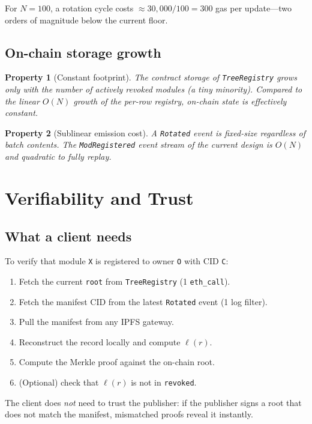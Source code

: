 \documentclass[11pt,a4paper]{article}
\newtheorem{property}{Property}[section]
\begin{document}
For $N = 100$, a rotation cycle costs $\approx 30{,}000 / 100 = 300$ gas per update---two orders of magnitude below the current floor.

\subsection{On-chain storage growth}

\begin{property}[Constant footprint]
The contract storage of \texttt{TreeRegistry} grows only with the number of actively revoked modules (a tiny minority). Compared to the linear $O(N)$ growth of the per-row registry, on-chain state is effectively constant.
\end{property}

\begin{property}[Sublinear emission cost]
A \texttt{Rotated} event is fixed-size regardless of batch contents. The \texttt{ModRegistered} event stream of the current design is $O(N)$ and quadratic to fully replay.
\end{property}

\section{Verifiability and Trust}

\subsection{What a client needs}

To verify that module \texttt{X} is registered to owner \texttt{O} with CID \texttt{C}:

\begin{enumerate}
    \item Fetch the current \texttt{root} from \texttt{TreeRegistry} (1 \texttt{eth\_call}).
    \item Fetch the manifest CID from the latest \texttt{Rotated} event (1 log filter).
    \item Pull the manifest from any IPFS gateway.
    \item Reconstruct the record locally and compute $\ell(r)$.
    \item Compute the Merkle proof against the on-chain root.
    \item (Optional) check that $\ell(r)$ is not in \texttt{revoked}.
\end{enumerate}

The client does \emph{not} need to trust the publisher: if the publisher signs a root that does not match the manifest, mismatched proofs reveal it instantly.
\end{document}
